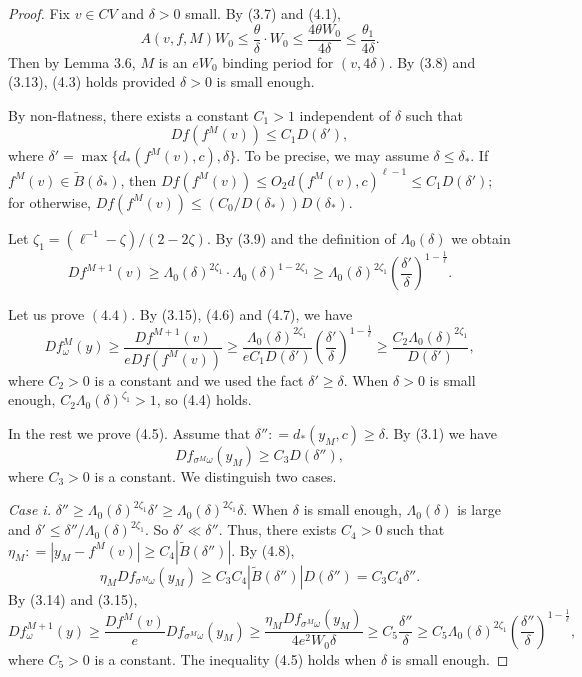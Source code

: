 \documentclass[11pt,oneside]{article}
\theoremstyle{plain}
\numberwithin{equation}{section}
\numberwithin{figure}{section}
\numberwithin{table}{section}
\begin{document}
\begin{proof}

Fix $v \in CV$ and $\delta > 0$ small. By (3.7) and (4.1),
\[
A(v, f, M)W_0 \leq \frac{\theta}{\delta} \cdot W_0 \leq \frac{4 \theta W_0}{4 \delta} \leq \frac{\theta_1}{4\delta}.
\]
Then by Lemma 3.6, $M$ is an $eW_0$ binding period for $(v, 4 \delta)$. By (3.8) and (3.13), (4.3) holds provided $\delta > 0$ is small enough. 


By non-flatness, there exists a constant $C_1 > 1$ independent of $\delta$ such that 
\begin{equation}
Df(f^M(v)) \leq C_1 D(\delta'), 
\end{equation}
where $\delta' = \max\{d_*(f^M(v), c), \delta\}$. To be precise, we may assume $\delta \leq \delta_*$. If $f^M(v) \in \tilde B(\delta_*)$, then $Df(f^M(v)) \leq O_2 d(f^M(v), c)^{\ell -1} \leq C_1 D(\delta')$; for otherwise, $Df(f^M(v)) \leq (C_0/D(\delta_*)) D(\delta_*) $.


Let $\zeta_1 = ({\ell}^{-1} - \zeta)/(2 - 2 \zeta)$. By (3.9) and the definition of $\Lambda_0(\delta)$ we obtain
\begin{equation}
Df^{M+1}(v) \geq \Lambda_0(\delta)^{2 \zeta_1} \cdot \Lambda_0(\delta)^{1- 2 \zeta_1} \geq \Lambda_0(\delta)^{2 \zeta_1} \left( \frac{\delta'}{\delta} \right)^{1 - \frac{1}{\ell}}. 
\end{equation}


Let us prove $(4.4)$. By (3.15), (4.6) and (4.7), we have
\[
Df_{\omega}^M (y) \geq \frac{Df^{M+1}(v)}{e Df(f^M(v))} \geq \frac{\Lambda_0(\delta)^{2 \zeta_1}}{eC_1 D(\delta')} \left( \frac{\delta'}{\delta} \right)^{1 - \frac{1}{\ell}} \geq \frac{C_2 \Lambda_0(\delta)^{2 \zeta_1}}{D(\delta')},
\]
where $C_2 > 0$ is a constant and we used the fact $\delta' \geq \delta$. When $\delta > 0$ is small enough, $C_2 \Lambda_0(\delta)^{\zeta_1} > 1$, so (4.4) holds.


In the rest we prove (4.5). Assume that $\delta'' : = d_*(y_M, c) \geq \delta$. By (3.1) we have
\begin{equation}
Df_{\sigma^M \omega} (y_M) \geq C_3 D(\delta''),
\end{equation}
where $C_3 > 0$ is a constant.  We distinguish two cases.


{\it Case i.} $\delta'' \geq \Lambda_0(\delta)^{2 \zeta_1} \delta' \geq \Lambda_0(\delta)^{2 \zeta_1} \delta$. When $\delta$ is small enough, $\Lambda_0(\delta)$ is large and $\delta' \leq \delta''/\Lambda_0(\delta)^{2 \zeta_1}$. So $\delta' \ll \delta''$. Thus, there exists $C_4 > 0$ such that $\eta_M : = |y_M - f^M(v)| \geq C_4 |\tilde B(\delta'')|$. By (4.8),
\[
\eta_M Df_{\sigma^M \omega} (y_M) \geq C_3 C_4  |\tilde B(\delta'')| D(\delta'') = C_3 C_4 \delta''.
\]
By (3.14) and (3.15), 
\[
Df_{\omega}^{M+1}(y)  \geq \frac{Df^M(v)}{e} Df_{\sigma^M \omega} (y_M) \geq \frac{\eta_M Df_{\sigma^M \omega} (y_M)}{4e^2 W_0 \delta}\geq C_5 \frac{\delta''}{\delta} \geq C_5 \Lambda_0(\delta)^{2 \zeta_1} \left( \frac{\delta''}{\delta}\right)^{1 - \frac{1}{\ell}},
\]
where $C_5 > 0$ is a constant. The inequality (4.5) holds when $\delta$ is small enough. 



\end{proof}
\end{document}
